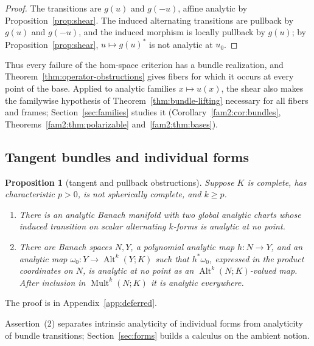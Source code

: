 \documentclass[11pt]{amsart}
\newtheorem{proposition}[theorem]{Proposition}
\theoremstyle{definition}
\theoremstyle{remark}
\numberwithin{equation}{section}
\newcommand{\Alt}{\operatorname{Alt}}
\newcommand{\Mult}{\operatorname{Mult}}
\theoremstyle{plain}
\theoremstyle{definition}
\theoremstyle{plain}
\begin{document}
\begin{proof}
The transitions are $g(u)$ and $g(-u)$, affine analytic by Proposition~\ref{prop:shear}. The induced alternating transitions are pullback by $g(u)$ and $g(-u)$, and the induced morphism is locally pullback by $g(u)$; by Proposition~\ref{prop:shear}, $u\mapsto g(u)^*$ is not analytic at $u_0$.
\end{proof}

Thus every failure of the hom-space criterion has a bundle realization, and Theorem~\ref{thm:operator-obstructions} gives fibers for which it occurs at every point of the base. Applied to analytic families $x\mapsto u(x)$, the shear also makes the familywise hypothesis of Theorem~\ref{thm:bundle-lifting} necessary for all fibers and frames; Section~\ref{sec:families} studies it (Corollary~\ref{fam2:cor:bundles}, Theorems~\ref{fam2:thm:polarizable} and~\ref{fam2:thm:bases}).

\subsection{Tangent bundles and individual forms}

\begin{proposition}[tangent and pullback obstructions]\label{prop:tangent-obstruction}
Suppose $K$ is complete, has characteristic $p>0$, is not spherically complete, and $k\ge p$.
\begin{enumerate}
\item There is an analytic Banach manifold with two global analytic charts whose induced transition on scalar alternating $k$\nobreakdash-forms is analytic at no point.
\item There are Banach spaces $N,Y$, a polynomial analytic map $h\colon N\to Y$, and an analytic map $\omega_0\colon Y\to\Alt^k(Y;K)$ such that $h^*\omega_0$, expressed in the product coordinates on $N$, is analytic at no point as an $\Alt^k(N;K)$\nobreakdash-valued map. After inclusion in $\Mult^k(N;K)$ it is analytic everywhere.
\end{enumerate}
\end{proposition}

The proof is in Appendix~\ref{app:deferred}.

Assertion~(2) separates intrinsic analyticity of individual forms from analyticity of bundle transitions; Section~\ref{sec:forms} builds a calculus on the ambient notion.
\end{document}
